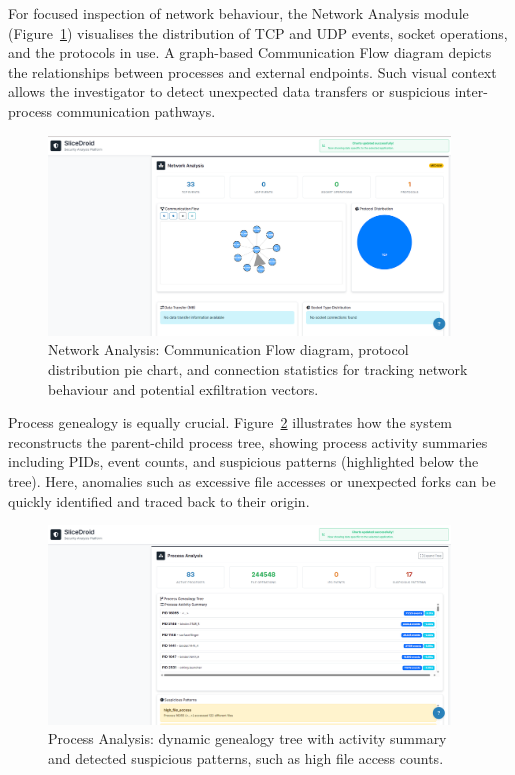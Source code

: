 \documentclass[a4paper,12pt]{report}
\begin{document}
For focused inspection of network behaviour, the Network Analysis module (Figure~\ref{fig:network_view}) visualises the distribution of TCP and UDP events, socket operations, and the protocols in use. A graph-based Communication Flow diagram depicts the relationships between processes and external endpoints. Such visual context allows the investigator to detect unexpected data transfers or suspicious inter-process communication pathways.

\begin{figure}[H]
\centering
\includegraphics[width=0.95\textwidth]{network_view.png}
\caption{Network Analysis: Communication Flow diagram, protocol distribution pie chart, and connection statistics for tracking network behaviour and potential exfiltration vectors.}
\label{fig:network_view}
\end{figure}

Process genealogy is equally crucial. Figure~\ref{fig:process_tree} illustrates how the system reconstructs the parent-child process tree, showing process activity summaries including PIDs, event counts, and suspicious patterns (highlighted below the tree). Here, anomalies such as excessive file accesses or unexpected forks can be quickly identified and traced back to their origin.

\begin{figure}[H]
\centering
\includegraphics[width=0.95\textwidth]{process_tree.png}
\caption{Process Analysis: dynamic genealogy tree with activity summary and detected suspicious patterns, such as high file access counts.}
\label{fig:process_tree}
\end{figure}
\end{document}

